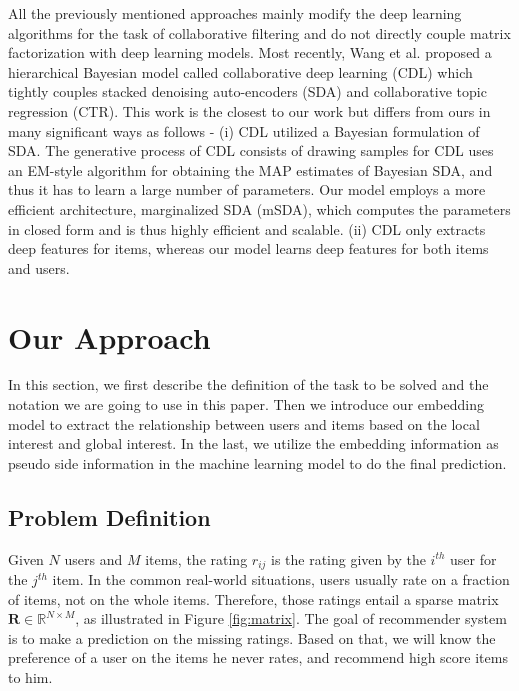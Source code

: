 \documentclass{sig-alternate-05-2015}
\begin{document}
All the previously mentioned approaches mainly modify the deep learning algorithms
for the task of collaborative filtering and
do not directly couple matrix factorization with deep learning models.
Most recently, Wang et al. \cite{wang2015collaborative} proposed a hierarchical Bayesian model
called collaborative deep learning (CDL) which tightly couples
stacked denoising auto-encoders (SDA) and collaborative topic regression (CTR).
This work is the closest to our work but differs from ours in many significant ways as follows -
(i) CDL utilized a Bayesian formulation of SDA.
The generative process of CDL consists of drawing samples for CDL uses an EM-style algorithm
for obtaining the MAP estimates of Bayesian SDA,
and thus it has to learn a large number of parameters.
Our model employs a more efficient architecture, marginalized SDA (mSDA),
which computes the parameters in closed form and is thus highly efficient and scalable.
(ii) CDL only extracts deep features for items,
whereas our model learns deep features for both items and users.

\section{Our Approach}
In this section,
we first describe the definition of the task to be solved and
the notation we are going to use in this paper. 
Then we introduce our embedding model to extract the relationship
between users and items based on the local interest and global interest.
In the last, we utilize the embedding information as pseudo side information
in the machine learning model to do the final prediction.

\subsection{Problem Definition}
Given $N$ users and $M$ items, the rating $r_{ij}$ is the rating given by
the $i^{th}$ user for the $j^{th}$ item.
In the common real-world situations,
users usually rate on a fraction of items, not on the whole items.
Therefore,
those ratings entail a sparse matrix $\mathbf{R} \in \mathbb{R}^{N \times M}$,
as illustrated in Figure \ref{fig:matrix}.
The goal of recommender system is to make a prediction on the missing ratings.
Based on that, we will know the preference of a user on the items he never rates,
and recommend high score items to him.
\end{document}

